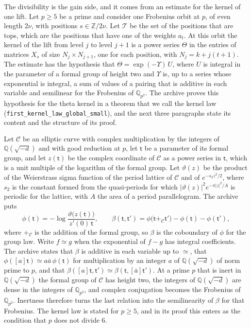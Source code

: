\documentclass[11pt,letterpaper]{article}
\numberwithin{equation}{section}
\begin{document}
The divisibility is the gain side, and it comes from an estimate for the kernel of one lift. Let $p\ge5$ be a prime and consider one Frobenius orbit at $p$, of even length $2\nu$, with positions $s\in\mathbb Z/2\nu$. Let $\mathcal T$ be the set of the positions that are tops, which are the positions that have one of the weights $a_t$. At this orbit the kernel of the lift from level $j$ to level $j+1$ is a power series $\Theta$ in the entries of matrices $X_s$ of size $N_j\times N_{j+1}$, one for each position, with $N_j=k+j(t+1)$. The estimate has the hypothesis that $\Theta=\exp(-\Upsilon)\,U$, where $U$ is integral in the parameter of a formal group of height two and $\Upsilon$ is, up to a series whose exponential is integral, a sum of values of a pairing that is additive in each variable and semilinear for the Frobenius of $\mathbb Q_{p^2}$. The archive proves this hypothesis for the theta kernel in a theorem that we call the kernel law (\texttt{first\_kernel\_law\_global\_small}), and the next three paragraphs state its content and the structure of its proof.

Let $\mathcal C$ be an elliptic curve with complex multiplication by the integers of $\mathbb Q(\sqrt{-d})$ and with good reduction at $p$, let $\mathsf t$ be a parameter of its formal group, and let $z(\mathsf t)$ be the complex coordinate of $\mathcal C$ as a power series in $\mathsf t$, which is a unit multiple of the logarithm of the formal group. Let $\vartheta(z)$ be the product of the Weierstrass sigma function of the period lattice of $\mathcal C$ and of $e^{-s_2z^2/2}$, where $s_2$ is the constant formed from the quasi-periods for which $|\vartheta(z)|^2e^{-\pi|z|^2/A}$ is periodic for the lattice, with $A$ the area of a period parallelogram. The archive puts
\[
\phi(\mathsf t)=-\log\frac{\vartheta\big(z(\mathsf t)\big)}{z'(0)\,\mathsf t},\qquad
\beta(\mathsf t,\mathsf t')=\phi\big(\mathsf t+_{\mathcal C}\mathsf t'\big)-\phi(\mathsf t)-\phi(\mathsf t'),
\]
where $+_{\mathcal C}$ is the addition of the formal group, so $\beta$ is the coboundary of $\phi$ for the group law. Write $f\simeq g$ when the exponential of $f-g$ has integral coefficients. The archive states that $\beta$ is additive in each variable up to $\simeq$, that $\phi([a]\mathsf t)\simeq a\bar a\,\phi(\mathsf t)$ for multiplication by an integer $a$ of $\mathbb Q(\sqrt{-d})$ of norm prime to $p$, and that $\beta([a]\mathsf t,\mathsf t')\simeq\beta(\mathsf t,[\bar a]\mathsf t')$. At a prime $p$ that is inert in $\mathbb Q(\sqrt{-d})$ the formal group of $\mathcal C$ has height two, the integers of $\mathbb Q(\sqrt{-d})$ are dense in the integers of $\mathbb Q_{p^2}$, and complex conjugation becomes the Frobenius of $\mathbb Q_{p^2}$. Inertness therefore turns the last relation into the semilinearity of $\beta$ for that Frobenius. The kernel law is stated for $p\ge5$, and in its proof this enters as the condition that $p$ does not divide $6$.
\end{document}
